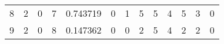 {\begin{tabular}{lrrrrrrrrrrrr}
8 &        2 &        0 &     7 &     0.743719 &                0 &                               1 &                                     5 &                5 &                    4 &                  5 &                     3 &                 0 \\
9 &        2 &        0 &     8 &     0.147362 &                0 &                               0 &                                     2 &                5 &                    4 &                  2 &                     2 &                 0 \\
\bottomrule
\end{tabular}
}

